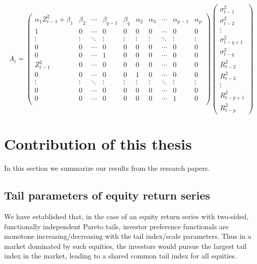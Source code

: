 \[
A_i =
\begin{pmatrix}
  \alpha_1 Z_{t-1}^2 + \beta_1 & \beta_2 & \cdots &
  \beta_{q-1} & \beta_q & \alpha_2 & \alpha_3 &
  \cdots & \alpha_{p-1} & \alpha_p\\
  1 & 0 & \cdots & 
  0 & 0 & 0 & 0 & \cdots & 0 & 0 \\
  \vdots & \vdots & \ddots & 
  \vdots & \vdots & \vdots & \vdots &
  \ddots & \vdots & \vdots \\
  0 & 0 & \cdots &
  0 & 0 & 0 & 0 & \cdots & 0 & 0 \\
  0 & 0 & \cdots &
  1 & 0 & 0 & 0 & \cdots & 0 & 0 \\
  Z_{t-1}^2 & 0 & \cdots &
  0 & 0 & 0 & 0 & \cdots & 0 & 0 \\
  0 & 0 & \cdots &
  0 & 0 & 1 & 0 & \cdots & 0 & 0 \\
  \vdots & \vdots & \ddots &
  \vdots & \vdots & \vdots & \vdots &
  \ddots & \vdots & \vdots \\
  0 & 0 & \cdots &
  0 & 0 & 0 & 0 & \cdots & 0 & 0 \\    
  0 & 0 & \cdots &
  0 & 0 & 0 & 0 & \cdots & 1 & 0 \\    
\end{pmatrix}
\begin{pmatrix}
  \sigma_{t-1}^2 \\
  \sigma_{t-2}^2 \\
  \vdots \\
  \sigma_{t-q+1}^2 \\
  \sigma_{t-q}^2 \\
  R_{t-2}^2 \\
  R_{t-3}^2 \\
  \vdots \\
  R_{t-p+1}^2 \\
  R_{t-p}^2
\end{pmatrix}
\]

\section{Contribution of this thesis}\label{sec:contr}

In this section we summarize our results from the research papers.

\subsection{Tail parameters of equity return series}
We have established that, in the case of an equity return series with
two-sided, functionally independent Pareto tails, investor
preference functionals are monotone increasing/decreasing with the
tail index/scale parameters. Thus in a market dominated by such
equities, the investors would pursue the largest tail index in the
market, leading to a shared common tail index for all equities.


